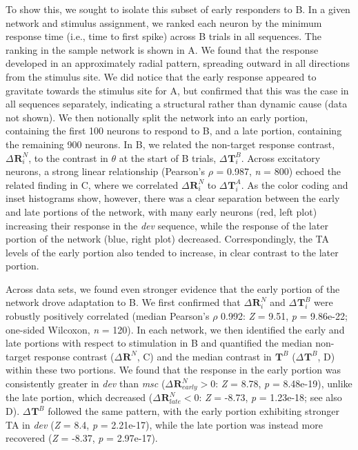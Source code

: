 \documentclass[9pt,lineno,onehalfspacing]{elife}
\newcommand{\dev}{\textit{dev}}
\newcommand{\msc}{\textit{msc}}
\newcommand{\R}[3][]{{}^{#1}_{}\boldsymbol R^{#2}_{#3}}
\newcommand{\T}[3][]{{}^{#1}_{}\boldsymbol T^{#2}_{#3}}
\begin{document}
To show this, we sought to isolate this subset of early responders to B. In a given network and stimulus assignment, we ranked each neuron by the minimum response time (i.e., time to first spike) across B trials in all sequences. The ranking in the sample network is shown in A. We found that the response developed in an approximately radial pattern, spreading outward in all directions from the stimulus site. We did notice that the early response appeared to gravitate towards the stimulus site for A, but confirmed that this was the case in all sequences separately, indicating a structural rather than dynamic cause (data not shown). We then notionally split the network into an early portion, containing the first 100 neurons to respond to B, and a late portion, containing the remaining 900 neurons. In B, we related the non-target response contrast, $\Delta \R{N}{i}$, to the contrast in $\theta$ at the start of B trials, $\Delta \T{B}{i}$. Across excitatory neurons, a strong linear relationship (Pearson's $\rho$ = 0.987, \textit{n} = 800) echoed the related finding in C, where we correlated $\Delta \R{N}{i}$ to $\Delta \T{A}{i}$. As the color coding and inset histograms show, however, there was a clear separation between the early and late portions of the network, with many early neurons (red, left plot) increasing their response in the \dev{} sequence, while the response of the later portion of the network (blue, right plot) decreased. Correspondingly, the TA levels of the early portion also tended to increase, in clear contrast to the later portion.

Across data sets, we found even stronger evidence that the early portion of the network drove adaptation to B. We first confirmed that $\Delta \R{N}{i}$ and $\Delta \T{B}{i}$ were robustly positively correlated (median Pearson's $\rho$ 0.992: \textit{Z} = 9.51, \textit{p} = 9.86e-22; one-sided Wilcoxon, \textit{n} = 120). In each network, we then identified the early and late portions with respect to stimulation in B and quantified the median non-target response contrast ($\Delta \R{N}{}$, C) and the median contrast in $\T{B}{}$ ($\Delta \T{B}{}$, D) within these two portions. We found that the response in the early portion was consistently greater in \dev{} than \msc{} ($\Delta \R{N}{early} > 0$: \textit{Z} = 8.78, \textit{p} = 8.48e-19), unlike the late portion, which decreased ($\Delta \R{N}{late} < 0$: \textit{Z} = -8.73, \textit{p} = 1.23e-18; see also D). $\Delta \T{B}{}$ followed the same pattern, with the early portion exhibiting stronger TA in \dev{} (\textit{Z} = 8.4, \textit{p} = 2.21e-17), while the late portion was instead more recovered (\textit{Z} = -8.37, \textit{p} = 2.97e-17).
\end{document}
